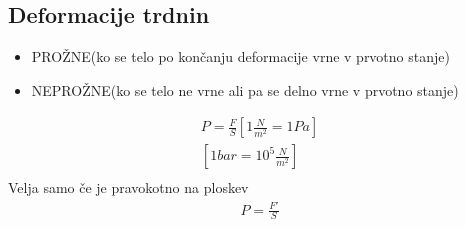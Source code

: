 {\color{indiagreen}\subsection{Deformacije trdnin}}
\begin{itemize}
	\item PROŽNE(ko se telo po končanju deformacije vrne v prvotno stanje)
	\item NEPROŽNE(ko se telo ne vrne ali pa se delno vrne v prvotno stanje)
\end{itemize}
\begin{align*}
	P=\frac{F}{S} [1\frac{N}{m^2} = 1Pa]\\
	[1bar = 10^5\frac{N}{m^2}]\\	
\end{align*}
Velja samo če je pravokotno na ploskev
\begin{align*}
	P=\frac{F'}{S}\\
\end{align*}
